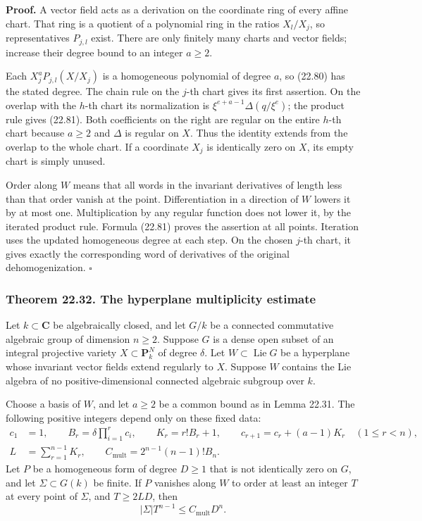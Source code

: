 \documentclass[
  11pt,
  a4paper,
]{article}
\begin{document}
\textbf{Proof.} A vector field acts as a derivation on the coordinate
ring of every affine chart. That ring is a quotient of a polynomial ring
in the ratios \(X_l/X_j\), so representatives \(P_{j,l}\) exist. There
are only finitely many charts and vector fields; increase their degree
bound to an integer \(a\ge2\).

Each \(X_j^aP_{j,l}(X/X_j)\) is a homogeneous polynomial of degree
\(a\), so (22.80) has the stated degree. The chain rule on the \(j\)-th
chart gives its first assertion. On the overlap with the \(h\)-th chart
its normalization is \(\xi^{e+a-1}\Delta(q/\xi^e)\); the product rule
gives (22.81). Both coefficients on the right are regular on the entire
\(h\)-th chart because \(a\ge2\) and \(\Delta\) is regular on \(X\).
Thus the identity extends from the overlap to the whole chart. If a
coordinate \(X_j\) is identically zero on \(X\), its empty chart is
simply unused.

Order along \(W\) means that all words in the invariant derivatives of
length less than that order vanish at the point. Differentiation in a
direction of \(W\) lowers it by at most one. Multiplication by any
regular function does not lower it, by the iterated product rule.
Formula (22.81) proves the assertion at all points. Iteration uses the
updated homogeneous degree at each step. On the chosen \(j\)-th chart,
it gives exactly the corresponding word of derivatives of the original
dehomogenization. \(\square\)

\subsubsection{Theorem 22.32. The hyperplane multiplicity
estimate}\label{theorem-22.32.-the-hyperplane-multiplicity-estimate}

Let \(k\subset\mathbf C\) be algebraically closed, and let \(G/k\) be a
connected commutative algebraic group of dimension \(n\ge2\). Suppose
\(G\) is a dense open subset of an integral projective variety
\(X\subset\mathbf P^N_k\) of degree \(\delta\). Let
\(W\subset\operatorname{Lie}G\) be a hyperplane whose invariant vector
fields extend regularly to \(X\). Suppose \(W\) contains the Lie algebra
of no positive-dimensional connected algebraic subgroup over \(k\).

Choose a basis of \(W\), and let \(a\ge2\) be a common bound as in Lemma
22.31. The following positive integers depend only on these fixed data:
\[
 \begin{split}
 c_1&=1,\qquad B_r=\delta\prod_{i=1}^r c_i,\qquad
 K_r=r!B_r+1,\qquad
 c_{r+1}=c_r+(a-1)K_r\quad(1\le r<n),\\
 L&=\sum_{r=1}^{n-1}K_r,\qquad
 C_{\mathrm{mult}}=2^{n-1}(n-1)!B_n.
 \end{split}
 \tag{22.82}
\] Let \(P\) be a homogeneous form of degree \(D\ge1\) that is not
identically zero on \(G\), and let \(\Sigma\subset G(k)\) be finite. If
\(P\) vanishes along \(W\) to order at least an integer \(T\) at every
point of \(\Sigma\), and \(T\ge2LD\), then \[
                    |\Sigma|T^{n-1}\le C_{\mathrm{mult}}D^n.
 \tag{22.83}
\]
\end{document}

